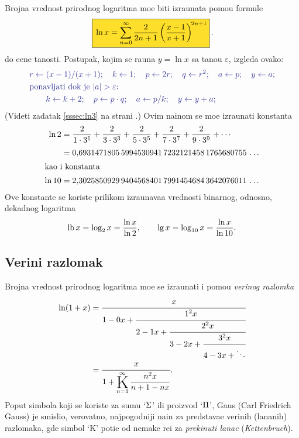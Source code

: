 \documentclass[12pt, twoside, a4paper]{article}
\def\K{\mathop{\vcenter{\hbox{\rm\huge K}}}\limits}
\def\n{n}
\def\Ki{\K_{\n=1}}
\def\Kinf#1#2{\Ki^\infty\displaystyle{\frac{#1}{#2}}}
\def\logten{\log_{10}}
\def\logtwo{\log_2}
\def\.{{,}}
\begin{document}
Brojna vrednost prirodnog logaritma mo{\zv}e biti izra{\cv}unata pomo{\cc}u formule
\begin{equation}
\okvir{
\ln x
=\sum_{n=0}^\infty\frac{2}{2n+1}\left(\frac{x-1}{x+1}\right)^{\!2n+1}
}.
\label{eq:lnred}
\end{equation}
do {\zv}e{\lj}ene ta{\cv}nosti.
Postupak, kojim se ra{\cv}una $y=\ln x$ sa ta{\cv}no{\sv}{\cc}u $\varepsilon$,
izgleda ovako:
\def\asg{\leftarrow}%
\begin{equation}
\label{eq:alg}
\begingroup\color{Blue}
\begin{aligned}
&r\asg(x-1)/(x+1);\quad k\asg 1;\quad p\asg 2r;\quad q\asg r^2;\quad a\asg p;\quad y\asg a;\\
&\text{ponav{\lj}ati dok je $|a|>\varepsilon$:}\\
&\qquad k\asg k+2;\quad p\asg p\cdot q;\quad a\asg p/k;\quad y\asg y+a;
\end{aligned}
\endgroup
\end{equation}
(Videti zadatak \ref{sssec:ln3} na strani \pageref{sssec:ln3}.)
Ovim na{\cv}inom se mo{\zv}e izra{\cv}unati konstanta
\begin{align*}
\ln2
&=\frac{2}{1\cdot3^1}+\frac{2}{3\cdot3^3}+\frac{2}{5\cdot3^5}+\frac{2}{7\cdot3^7}+\frac{2}{9\cdot3^9}+\cdots\\
\noalign{\smallskip}
&= 0\.
6931471805\,
5994530941\,
7232121458\,
1765680755\,
\ldots\\
\intertext{kao i konstanta}
\ln 10&=2\.
3025850929\,
9404568401\,
7991454684\,
3642076011\,
\ldots
\end{align*}
Ove konstante se koriste prilikom izra{\cv}unava{\nj}a vrednosti binarnog, odnosno, dekadnog logaritma
$$
\lb x=\logtwo x={\ln x\over \ln2},\qquad \lg x=\logten x={\ln x\over \ln 10}.
$$

\subsection{Veri{\zv}ni razlomak}

Brojna vrednost prirodnog logaritma mo{\zv}e se izra{\cv}unati i pomo{\cc}u {\sl veri{\zv}nog razlomka}
\begin{align*}
\ln(1+x)
&=\cfrac{x}{1-0x+\cfrac{1^2x}{2-1x+\cfrac{2^2x}{3-2x+\cfrac{3^2x}{4-3x+\ddots}}}}\\
\noalign{\vskip-3pt}
&=\cfrac{x}{1+ \Kinf{\n^2x}{\n+1-\n x}}.
\end{align*}
Poput simbola koji se koriste za sumu `$\rm\Sigma$' ili proizvod `$\rm\Pi$', 
Gaus (Carl Friedrich Gauss) je smislio, verovatno, najpogodniji na{\cv}in za predstav{\lj}a{\nj}e
veri{\zv}nih (lan{\cv}anih) razlomaka,
gde simbol `K' poti{\cv}e od nema{\cv}ke re{\cv}i za {\sl prekinuti lanac\/} ({\sl Kettenbruch\/}). 
\end{document}
